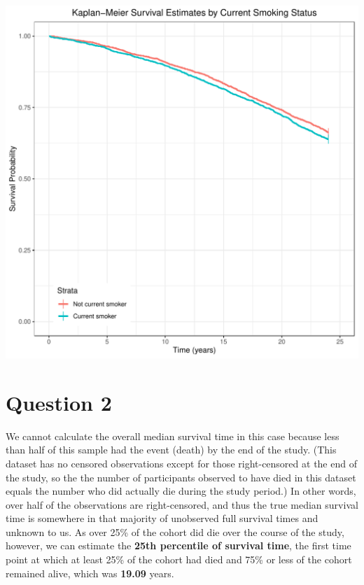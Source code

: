 \documentclass{article}\usepackage[]{graphicx}\usepackage[]{color}
\makeatletter
\def\maxwidth{ %
  \ifdim\Gin@nat@width>\linewidth
    \linewidth
  \else
    \Gin@nat@width
  \fi
}
\newenvironment{knitrout}{}{} %
\newif\ifdraft  %
\makeatother
\begin{document}
\begin{knitrout}
\color{fgcolor}
\includegraphics[width=\maxwidth]{figure/unnamed-chunk-15-1} 

\end{knitrout}


\pagebreak

\section*{Question 2}

\ifdraft

\textbf{Referring to the code from lecture}, are you able to calculate the overall median survival time in this case? If so, provide an estimate of this quantity, if not, describe why and provide an estimate of a percentile of survival time (of your choice). Interpret the quantity that you estimated. \textbf{(20 points)}

\vspace{2mm}



\fi

We cannot calculate the overall median survival time in this case because less than half of this sample had the event (death) by the end of the study.  (This dataset has no censored observations except for those right-censored at the end of the study, so the the number of participants observed to have died in this dataset equals the number who did actually die during the study period.)  In other words, over half of the observations are right-censored, and thus the true median survival time is somewhere in that majority of unobserved full survival times and unknown to us.  As over 25\% of the cohort did die over the course of the study, however, we can estimate the \textbf{25th percentile of survival time}, the first time point at which at least 25\% of the cohort had died and 75\% or less of the cohort remained alive, which was \textbf{19.09} years.  
\end{document}
